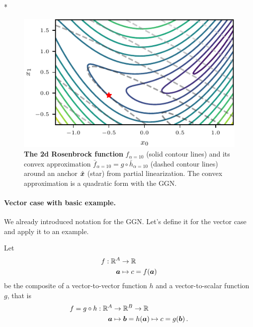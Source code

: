 \switchcolumn[1]*
\begin{figure}[H]
  \centering
  \includegraphics[width=\linewidth]{../kfs/plots/linearized_rosenbrock.pdf}
  \caption{\textbf{The 2d Rosenbrock function} $f_{\alpha=10}$ (solid contour lines) and its convex approximation $\bar{f}_{\alpha=10} = g \circ \bar{h}_{\alpha=10}$ (dashed contour lines) around an anchor $\hat{{\bm{x}}}$ (star) from partial linearization.
    The convex approximation is a quadratic form with the GGN.}\label{fig:2d-rosenbrock}
\end{figure}
\switchcolumn[0]

\paragraph{Vector case with basic example.}
We already introduced notation for the GGN.
Let's define it for the vector case and apply it to an example.

\switchcolumn[1]
\switchcolumn[0]

\begin{setup}\label{setup:composite_vector_to_vector_to_scalar_function}
  Let
  \begin{align*}
    f: {\mathbb{R}}^{A} & \to {\mathbb{R}}
    \\
    {\bm{a}}        & \mapsto c = f({\bm{a}})
  \end{align*}
  be the composite of a vector-to-vector function $h$ and a vector-to-scalar function $g$, that is
  \begin{align*}
    f = g \circ h: {\mathbb{R}}^A & \to {\mathbb{R}}^B \to {\mathbb{R}}
    \\
    {\bm{a}}                  & \mapsto {\bm{b}} = h({\bm{a}}) \mapsto c = g({\bm{b}})\,.
  \end{align*}
\end{setup}

